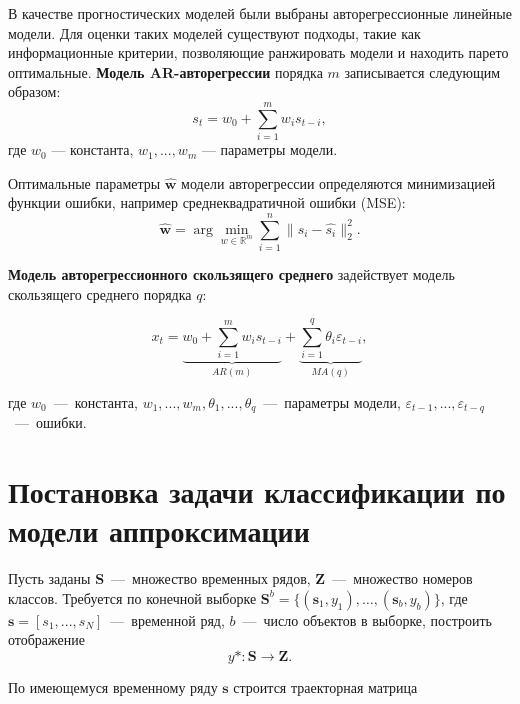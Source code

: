 \documentclass[article,14pt,subf,href,colorlinks=true
]{disser}
\begin{document}
В качестве прогностических моделей были выбраны авторегрессионные линейные модели.
Для оценки таких моделей существуют подходы, такие как информационные критерии, позволяющие ранжировать модели и находить парето оптимальные.
\textbf{Модель AR-авторегрессии} порядка $m$ записывается следующим образом:
\[
s_t = w_0 + \sum\limits_{i=1}^{m}{w_is_{t-i}},
\]
где $w_0$ --- константа, $w_1, ..., w_m$ --- параметры модели. 

Оптимальные параметры $\boldsymbol{\hat{w}}$ модели авторегрессии определяются минимизацией функции ошибки, например среднеквадратичной ошибки (MSE):
$$\boldsymbol{\hat{w}} = \arg\min\limits_{w \in \mathbb{R}^m}\sum\limits_{i = 1}^{n}\|s_i - \hat{s_i}\|^2_2.$$

\textbf{Модель авторегрессионного скользящего среднего} задействует модель скользящего среднего порядка $q$:

\[
x_t = \underbrace{w_0 + \sum\limits_{i=1}^{m}{w_is_{t-i}}}_{AR(m)} + \underbrace{\sum\limits_{i=1}^{q}{\theta_i\varepsilon_{t-i}}}_{MA(q)},
\]

где $w_0$~---~константа, $w_1, ..., w_m, \theta_1, ..., \theta_q$~---~параметры модели, $\varepsilon_{t - 1}, ..., \varepsilon_{t - q}$~---~ошибки.
\section{Постановка задачи классификации по модели аппроксимации}

Пусть заданы $\mathbf{S}$~---~множество временных рядов, $\mathbf{Z}$~---~множество номеров классов.
Требуется по конечной выборке $\mathbf{S}^{b} = \{(\mathbf{s}_1, y_1),\dots,(\mathbf{s}_{b}, y_{b}) \}$, где  $\mathbf{s}=[s_1,...,s_N]$~---~временной ряд, $b$~---~число объектов в выборке, построить отображение
\begin{equation}
y*:\mathbf{S} \xrightarrow{} \mathbf{Z}.
\label{eq:y*}
\end{equation}

По имеющемуся временному ряду $\mathbf{s}$ строится траекторная матрица
\end{document}
